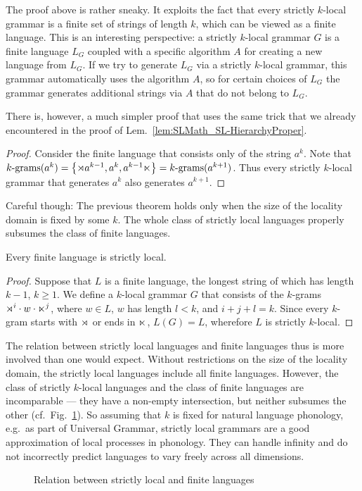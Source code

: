 %
The proof above is rather sneaky.
It exploits the fact that every strictly $k$-local grammar is a finite set of strings of length $k$, which can be viewed as a finite language.
This is an interesting perspective: a strictly $k$-local grammar $G$ is a finite language $L_G$ coupled with a specific algorithm $A$ for creating a new language from $L_G$.
If we try to generate $L_G$ via a strictly $k$-local grammar, this grammar automatically uses the algorithm $A$, so for certain choices of $L_G$ the grammar generates additional strings via $A$ that do not belong to $L_G$.

There is, however, a much simpler proof that uses the same trick that we already encountered in the proof of Lem.~\ref{lem:SLMath_SL-HierarchyProper}.
%
\begin{proof}
    Consider the finite language that consists only of the string $a^k$.
    Note that $\Bigrams[k](a^k) = \setof{\LeftEdge a^{k-1}, a^k, a^{k-1} \RightEdge} = \Bigrams[k](a^{k+1})$.
    Thus every strictly $k$-local grammar that generates $a^k$ also generates $a^{k+1}$.
\end{proof}

Careful though: The previous theorem holds only when the size of the locality domain is fixed by some $k$.
The whole class of strictly local languages properly subsumes the class of finite languages.
%
\begin{theorem}
    Every finite language is strictly local.
\end{theorem}
%
\begin{proof}
    Suppose that $L$ is a finite language, the longest string of which has length $k - 1$, $k \geq 1$.
    We define a $k$-local grammar $G$ that consists of the $k$-grams $\LeftEdge^i \stringcat w \stringcat \RightEdge^j$, where $w \in L$, $w$ has length $l < k$, and $i + j + l = k$.
    Since every $k$-gram starts with $\LeftEdge$ or ends in $\RightEdge$, $L(G) = L$, wherefore $L$ is strictly $k$-local.
\end{proof}
%
The relation between strictly local languages and finite languages thus is more involved than one would expect.
Without restrictions on the size of the locality domain, the strictly local languages include all finite languages.
However, the class of strictly $k$-local languages and the class of finite languages are incomparable --- they have a non-empty intersection, but neither subsumes the other (cf.\ Fig.~\ref{fig:SLMath_SL-Fin}).
So assuming that $k$ is fixed for natural language phonology, e.g.\ as part of Universal Grammar, strictly local grammars are a good approximation of local processes in phonology.
They can handle infinity and do not incorrectly predict languages to vary freely across all dimensions.
%
\begin{figure}[htpb]
    \centering
    
    \caption{Relation between strictly local and finite languages}
    \label{fig:SLMath_SL-Fin}
\end{figure}


